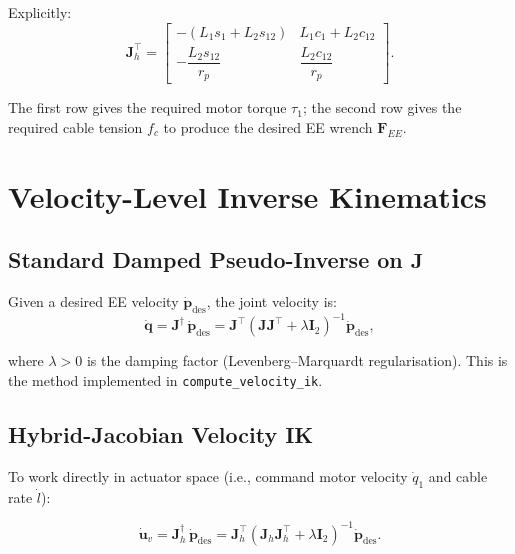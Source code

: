\documentclass[12pt, a4paper]{article}
\theoremstyle{definition}
\newcommand{\bq}{\bm{q}}
\newcommand{\bp}{\bm{p}}
\newcommand{\bu}{\bm{u}}
\newcommand{\bF}{\bm{F}}
\newcommand{\bJ}{\bm{J}}
\newcommand{\cq}[1]{c_{#1}}   %
\newcommand{\sq}[1]{s_{#1}}   %
\newcommand{\cqq}[2]{c_{{#1}{#2}}}  %
\newcommand{\sqq}[2]{s_{{#1}{#2}}}  %
\begin{document}
\noindent
Explicitly:
\begin{equation}
  \label{eq:Jh_T}
  \bJ_h^\top =
  \begin{bmatrix}
    -(L_1 \sq{1} + L_2 \sqq{1}{2}) & L_1 \cq{1} + L_2 \cqq{1}{2} \\[6pt]
    -\dfrac{L_2 \sqq{1}{2}}{r_p}   & \dfrac{L_2 \cqq{1}{2}}{r_p}
  \end{bmatrix}.
\end{equation}

The first row gives the required motor torque $\tau_1$; the second row gives the
required cable tension $f_c$ to produce the desired EE wrench $\bF_{EE}$.

\section{Velocity-Level Inverse Kinematics}
\label{sec:vel_ik}

\subsection{Standard Damped Pseudo-Inverse on \texorpdfstring{$\bJ$}{J}}

Given a desired EE velocity $\dot{\bp}_{\text{des}}$, the joint velocity is:
\begin{equation}
  \label{eq:q_dot_ik}
  \dot{\bq}
  = \bJ^\dag\,\dot{\bp}_{\text{des}}
  = \bJ^\top\!\left(\bJ \bJ^\top + \lambda \bm{I}_2\right)^{-1}\dot{\bp}_{\text{des}},
\end{equation}

where $\lambda > 0$ is the damping factor (Levenberg--Marquardt regularisation).
This is the method implemented in \texttt{compute\_velocity\_ik}.

\subsection{Hybrid-Jacobian Velocity IK}

To work directly in actuator space (i.e., command motor velocity $\dot{q}_1$ and
cable rate $\dot{l}$):

\begin{equation}
  \label{eq:uv_ik}
  \dot{\bu}_v
  = \bJ_h^\dag\,\dot{\bp}_{\text{des}}
  = \bJ_h^\top\!\left(\bJ_h \bJ_h^\top + \lambda \bm{I}_2\right)^{-1}
    \dot{\bp}_{\text{des}}.
\end{equation}
\end{document}
